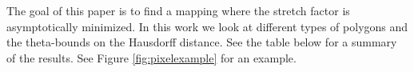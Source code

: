 \documentclass[a4paper, UKenglish]{lipics-v2018}
\newcommand{\mremark}[3]{\textcolor{blue}{\textsc{#1 #2:}} \textcolor{SeaGreen}{\textsf{#3}}}
\newcommand{\jerome}[2][says]{\mremark{J\'er\^ome}{#1}{#2}}
\newcommand{\eps}{\varepsilon}
\begin{document}

The goal of this paper is to find a mapping where the stretch factor is asymptotically minimized. In this work we look at different types of polygons and the theta-bounds on the Hausdorff distance. See the table below for a summary of the results.
See Figure \ref{fig:pixelexample} for an example.






\end{document}
